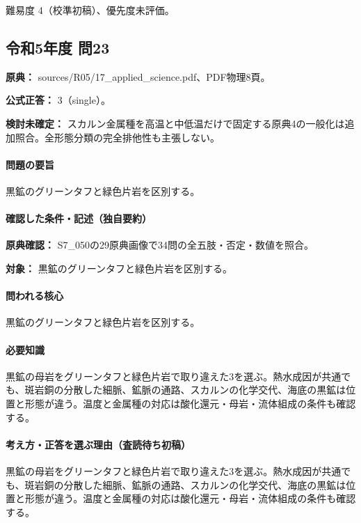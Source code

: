 \par 難易度 4（校準初稿）、優先度未評価。

\subsection{令和5年度 問23}
\label{q:r05-reg-applied-23}

\noindent\textbf{原典：} sources/R05/17\_applied\_science.pdf、PDF物理8頁。

\textbf{公式正答：} 3（single）。

\par\textbf{検討未確定：} スカルン金属種を高温と中低温だけで固定する原典4の一般化は追加照合。全形態分類の完全排他性も主張しない。

\paragraph{問題の要旨} 黒鉱のグリーンタフと緑色片岩を区別する。

\paragraph{確認した条件・記述（独自要約）}\mbox{}\par

\noindent\textbf{原典確認：} S7\_050の29原典画像で34問の全五肢・否定・数値を照合。\par

\noindent\textbf{対象：} 黒鉱のグリーンタフと緑色片岩を区別する。\par

\paragraph{問われる核心} 黒鉱のグリーンタフと緑色片岩を区別する。

\paragraph{必要知識} 黒鉱の母岩をグリーンタフと緑色片岩で取り違えた3を選ぶ。熱水成因が共通でも、斑岩銅の分散した細脈、鉱脈の通路、スカルンの化学交代、海底の黒鉱は位置と形態が違う。温度と金属種の対応は酸化還元・母岩・流体組成の条件も確認する。

\paragraph{考え方・正答を選ぶ理由（査読待ち初稿）} 黒鉱の母岩をグリーンタフと緑色片岩で取り違えた3を選ぶ。熱水成因が共通でも、斑岩銅の分散した細脈、鉱脈の通路、スカルンの化学交代、海底の黒鉱は位置と形態が違う。温度と金属種の対応は酸化還元・母岩・流体組成の条件も確認する。


